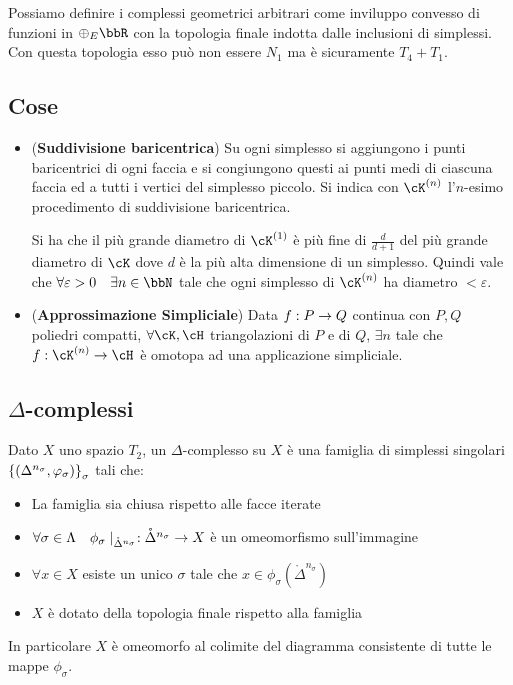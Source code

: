 \documentclass[a4paper,NoNotes,GeneralMath]{stdmdoc}
\begin{document}
Possiamo definire i complessi geometrici arbitrari come inviluppo convesso di funzioni in $\oplus_E \bbR$ con la topologia finale indotta dalle inclusioni di simplessi.
Con questa topologia esso può non essere $N_1$ ma è sicuramente $T_4 + T_1$.

\subsection*{Cose}
\begin{itemize}
\item ({\bf Suddivisione baricentrica}) Su ogni simplesso si aggiungono i punti baricentrici di ogni faccia e si congiungono questi ai punti medi di ciascuna faccia ed a tutti i vertici del simplesso piccolo. Si indica con $\cK^{(n)}$ l'$n$-esimo procedimento di suddivisione baricentrica.

  Si ha che il più grande diametro di $\cK^{(1)}$ è più fine di $\frac{d}{d + 1}$ del più grande diametro di $\cK$ dove $d$ è la più alta dimensione di un simplesso.
  Quindi vale che $\forall \varepsilon > 0 \quad \exists n \in \bbN$ tale che ogni simplesso di $\cK^{(n)}$ ha diametro $< \varepsilon$.
\item ({\bf Approssimazione Simpliciale}) Data $f: P \rightarrow Q$ continua con $P, Q$ poliedri compatti, $\forall \cK, \cH$ triangolazioni di $P$ e di $Q$, $\exists n$ tale che $f: \cK^{(n)} \rar \cH$ è omotopa ad una applicazione simpliciale.
\end{itemize}

\subsection*{$\Delta$-complessi}
Dato $X$ uno spazio $T_2$, un $\Delta$-complesso su $X$ è una famiglia di simplessi singolari $\left\{{(\Delta^{n_\sigma}, \varphi_\sigma)}\right\}_\sigma$ tali che:
\begin{itemize}
\item La famiglia sia chiusa rispetto alle facce iterate
\item $\forall \sigma \in \Lambda \quad \phi_\sigma \mid_{\mathring\Delta^{n_\sigma}}: \mathring\Delta^{n_\sigma} \rightarrow X$ è un omeomorfismo sull'immagine
\item $\forall x \in X$ esiste un unico $\sigma$ tale che $x \in \phi_\sigma(\mathring\Delta^{n_\sigma})$
\item $X$ è dotato della topologia finale rispetto alla famiglia
\end{itemize}
In particolare $X$ è omeomorfo al colimite del diagramma consistente di tutte le mappe $\phi_\sigma$.
\end{document}
